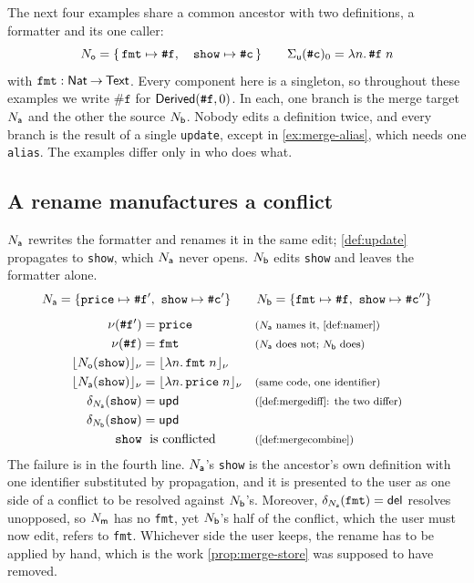 \documentclass[11pt]{article}
\theoremstyle{definition}
\theoremstyle{plain}
\theoremstyle{remark}
\begin{document}
The next four examples share a common ancestor with two definitions, a formatter and its one caller:
\[
  N_{\mathsf{o}} = \{\,\texttt{fmt} \mapsto \texttt{\#f},\quad
           \texttt{show} \mapsto \texttt{\#c}\,\}
  \qquad
  \Sigma_{\mathsf{u}}(\texttt{\#c})_0 = \lambda n.\,\texttt{\#f}\;n
\]
with $\texttt{fmt} : \mathsf{Nat} \mathbin{\to} \mathsf{Text}$. Every component here is a singleton, so throughout these
examples we write $\texttt{\#f}$ for $\mathsf{Derived}(\texttt{\#f},0)$. In each, one branch is the merge
target $N_{\mathsf{a}}$ and the other the source $N_{\mathsf{b}}$. Nobody edits a definition twice, and every branch is the
result of a single \texttt{update}, except in \cref{ex:merge-alias}, which needs one \texttt{alias}.
The examples differ only in who does what.

\subsection{A rename manufactures a conflict}\label{ex:merge-rename}

$N_{\mathsf{a}}$ rewrites the formatter and renames it in the same edit; \cref{def:update} propagates to
\texttt{show}, which $N_{\mathsf{a}}$ never opens. $N_{\mathsf{b}}$ edits \texttt{show} and leaves the formatter alone.
\[
  N_{\mathsf{a}} = \{\texttt{price} \mapsto \texttt{\#f}',\ \texttt{show} \mapsto \texttt{\#c}'\}
  \qquad
  N_{\mathsf{b}} = \{\texttt{fmt} \mapsto \texttt{\#f},\ \texttt{show} \mapsto \texttt{\#c}''\}
\]
\[
\begin{array}{r@{\;}l@{\quad}l}
  \namer(\texttt{\#f}') &= \texttt{price}
    & \just{$\NA$ names it, \cref{def:namer}} \\[3pt]
  \namer(\texttt{\#f}) &= \texttt{fmt}
    & \just{$\NA$ does not; $\NB$ does} \\[3pt]
  \syn{\namer}{\NO(\texttt{show})} &= \syn{\namer}{\ulam{n}{\uapp{\uvar{\texttt{fmt}}}{\uvar n}}} & \\[3pt]
  \syn{\namer}{\NA(\texttt{show})} &= \syn{\namer}{\ulam{n}{\uapp{\uvar{\texttt{price}}}{\uvar n}}}
    & \just{same code, one identifier} \\[3pt]
  \delta_{\NA}(\texttt{show}) &= \dupd
    & \just{\cref{def:mergediff}: the two differ} \\[3pt]
  \delta_{\NB}(\texttt{show}) &= \dupd & \\[3pt]
  \texttt{show} &\text{ is conflicted}
    & \just{\cref{def:mergecombine}}
\end{array}
\]
The failure is in the fourth line. $N_{\mathsf{a}}$'s \texttt{show} is the ancestor's own definition with one
identifier substituted by propagation, and it is presented to the user as one side of a conflict to be
resolved against $N_{\mathsf{b}}$'s. Moreover, $\delta_{N_{\mathsf{a}}}(\texttt{fmt}) = \mathsf{del}$ resolves unopposed, so $N_{\mathsf{m}}$
has no \texttt{fmt}, yet $N_{\mathsf{b}}$'s half of the conflict, which the user must now edit, refers to
\texttt{fmt}. Whichever side the user keeps, the rename has to be applied by hand, which is the work
\cref{prop:merge-store} was supposed to have removed.
\end{document}
